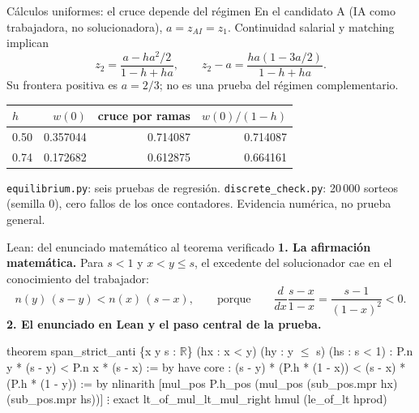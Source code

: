 \documentclass[11pt,aspectratio=169]{beamer}
\newcommand{\zai}{z_{AI}}
\begin{document}
\begin{frame}{Cálculos uniformes: el cruce depende del régimen}
  \small
  En el candidato A (IA como trabajadora, no solucionadora), $a=\zai=z_1$.
  Continuidad salarial y matching implican
  \[
    z_2=\frac{a-ha^2/2}{1-h+ha},
    \qquad z_2-a=\frac{ha(1-3a/2)}{1-h+ha}.
  \]
  Su frontera positiva es $a=2/3$; no es una prueba del régimen complementario.
  \centering
  \begin{tabular}{lrrr}
    \toprule
    $h$ & $w(0)$ & cruce por ramas & $w(0)/(1-h)$\\ \midrule
    0.50 & 0.357044 & 0.714087 & 0.714087\\
    0.74 & 0.172682 & 0.612875 & 0.664161\\ \bottomrule
  \end{tabular}
  \par\medskip\raggedright
  \texttt{equilibrium.py}: seis pruebas de regresión. \texttt{discrete\_check.py}: 20\,000
  sorteos (semilla 0), cero fallos de los once contadores. Evidencia numérica, no prueba general.
\end{frame}

\begin{frame}[fragile]{Lean: del enunciado matemático al teorema verificado}
  \textbf{1. La afirmación matemática.} Para $s<1$ y $x<y\le s$, el excedente del solucionador cae en el
  conocimiento del trabajador:
  \[
    n(y)\,(s-y)<n(x)\,(s-x),
    \qquad\text{porque}\qquad
    \frac{d}{dx}\frac{s-x}{1-x}=\frac{s-1}{(1-x)^{2}}<0 .
  \]
  \textbf{2. El enunciado en Lean y el paso central de la prueba.}
  \begin{semiverbatim}\footnotesize
theorem span_strict_anti \{x y s : \(\mathbb{R}\)\} (hx : x < y) (hy : y \(\le\) s) (hs : s < 1) :
    P.n y * (s - y) < P.n x * (s - x) := by
  have core : (s - y) * (P.h * (1 - x)) < (s - x) * (P.h * (1 - y)) := by
    nlinarith [mul_pos P.h_pos (mul_pos (sub_pos.mpr hx) (sub_pos.mpr hs))]
  \(\vdots\)
  exact lt_of_mul_lt_mul_right hmul (le_of_lt hprod)
  \end{semiverbatim}
\end{frame}
\end{document}
